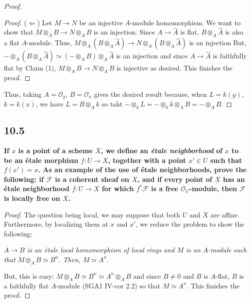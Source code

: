 \documentclass[11pt]{amsart}          %
\newcommand{\calO}{\mathcal{O}}
\newcommand{\calF}{\mathcal{F}}
\begin{document}
\begin{proof}
\begin{proof}
($\Leftarrow$) Let $M \to N$ be an injective $A$-module homomorphism. We want to show that $M \otimes_A B \to N \otimes_A B$ is an injection. Since $A \to \widehat{A}$ is flat, $B \otimes_A \widehat{A}$ is also a flat $A$-module. Thus, $M \otimes_A \left( B \otimes_A \widehat{A} \right) \to N \otimes_A \left( B \otimes_A \widehat{A} \right)$ is an injection But, $- \otimes_A \left( B \otimes_A \widehat{A} \right) \simeq \left( - \otimes_A B \right) \otimes_A \widehat{A}$ is an injection and since $A \to \widehat{A}$ is faithfully flat by Claim (1), $M \otimes_A B \to N \otimes_A B$ is injective as desired. This finishes the proof.
\end{proof}

Thus, taking $A = \calO_y$, $B = \calO_x$ gives the desired result because, when $L = k(y)$, $k = k(x)$, we have $L = B \otimes_A k$ so taht $- \otimes_k L = - \otimes_k k \otimes _A B = - \otimes_A B$.
\end{proof}

\subsection*{10.5}\textbf{If $x$ is a point of a scheme $X$, we define an {\it \'etale neighborhood} of $x$ to be an \'etale morphism $f: U \to X$, together with a point $x' \in U$ such that $f(x') = x$. As an example of the use of \'etale neighborhoods, prove the following: if $\calF$ is a coherent sheaf on $X$, and if every point of $X$ has an \'etale neighborhood $f: U \to X$ for which $f^* \calF $ is a free $\calO_U$-module, then $\calF$ is locally free on $X$. }

\begin{proof}The question being local, we may suppose that both $U$ and $X$ are affine. Furthermore, by localizing them at $x$ and $x'$, we reduce the problem to show the following:

{\it $A \to B$ is an \'etale local homomorphism of local rings and $M$ is an $A$-module such that $M \otimes_A B \simeq B^n$. Then, $M \simeq A^n$.}

But, this is easy: $M \otimes_A B \simeq B^n \simeq A ^n \otimes_A B$ and since $B \not = 0$ and $B$ is $A$-flat, $B$ is a faithfully flat $A$-module (SGA1 IV-cor 2.2) so that $M \simeq A^n$. This finishes the proof.
\end{proof}
\end{document}
